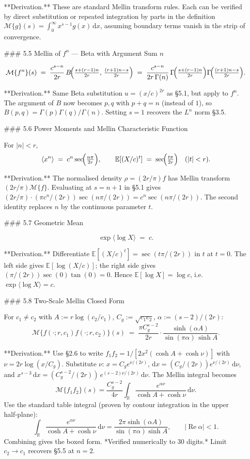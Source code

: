 **Derivation.** These are standard Mellin transform rules. Each can be verified by direct substitution or repeated integration by parts in the definition $\mathcal M\{g\}(s) = \int_{0}^{\infty}x^{s-1}g(x)\,\mathrm dx$, assuming boundary terms vanish in the strip of convergence.

### 5.5 Mellin of $f^{n}$ — Beta with Argument Sum $n$

$$
\mathcal M\{f^{n}\}(s) \;=\; \frac{c^{s-n}}{2r}\,B\!\Bigl(\tfrac{s+(r-1)n}{2r},\,\tfrac{(r+1)n-s}{2r}\Bigr) \;=\; \frac{c^{s-n}}{2r\,\Gamma(n)}\,\Gamma\!\Bigl(\tfrac{s+(r-1)n}{2r}\Bigr)\Gamma\!\Bigl(\tfrac{(r+1)n-s}{2r}\Bigr).
$$

**Derivation.** Same Beta substitution $u = (x/c)^{2r}$ as §5.1, but apply to $f^{n}$. The argument of $B$ now becomes $p,q$ with $p+q = n$ (instead of $1$), so $B(p,q) = \Gamma(p)\Gamma(q)/\Gamma(n)$. Setting $s=1$ recovers the $L^{n}$ norm §3.5.

### 5.6 Power Moments and Mellin Characteristic Function

For $|n|<r$,
$$
\langle x^{n}\rangle \;=\; c^{n}\sec\!\Bigl(\tfrac{n\pi}{2r}\Bigr),\qquad \mathbb E[(X/c)^{t}] \;=\; \sec\!\Bigl(\tfrac{t\pi}{2r}\Bigr)\quad(|t|<r).
$$

**Derivation.** The normalised density $\rho = (2r/\pi)f$ has Mellin transform $(2r/\pi)\mathcal M\{f\}$. Evaluating at $s = n+1$ in §5.1 gives $(2r/\pi)\cdot(\pi c^{n}/(2r))\sec(n\pi/(2r)) = c^{n}\sec(n\pi/(2r))$. The second identity replaces $n$ by the continuous parameter $t$.

### 5.7 Geometric Mean

$$
\exp\langle\log X\rangle \;=\; c.
$$

**Derivation.** Differentiate $\mathbb E[(X/c)^{t}] = \sec(t\pi/(2r))$ in $t$ at $t=0$. The left side gives $\mathbb E[\log(X/c)]$; the right side gives $(\pi/(2r))\sec(0)\tan(0) = 0$. Hence $\mathbb E[\log X] = \log c$, i.e. $\exp\langle\log X\rangle = c$.

### 5.8 Two‑Scale Mellin Closed Form

For $c_{1}\ne c_{2}$ with $A := r\log(c_{2}/c_{1})$, $C_{g} := \sqrt{c_{1}c_{2}}$, $\alpha := (s-2)/(2r)$:
$$
\boxed{\;\mathcal M\bigl\{f(\cdot;r,c_{1})f(\cdot;r,c_{2})\bigr\}(s) \;=\; \frac{\pi C_{g}^{s-2}}{2r}\cdot\frac{\sinh(\alpha A)}{\sin(\pi\alpha)\,\sinh A}.\;}
$$

**Derivation.** Use §2.6 to write $f_{1}f_{2} = 1/[2x^{2}(\cosh A + \cosh\nu)]$ with $\nu = 2r\log(x/C_{g})$. Substitute $\nu$: $x = C_{g}e^{\nu/(2r)}$, $\mathrm dx = (C_{g}/(2r))e^{\nu/(2r)}\,\mathrm d\nu$, and $x^{s-3}\,\mathrm dx = (C_{g}^{s-2}/(2r))\,e^{(s-2)\nu/(2r)}\,\mathrm d\nu$. The Mellin integral becomes
$$
\mathcal M\{f_{1}f_{2}\}(s) = \frac{C_{g}^{s-2}}{4r}\int_{\mathbb R}\frac{e^{\alpha\nu}}{\cosh A+\cosh\nu}\,\mathrm d\nu.
$$
Use the standard table integral (proven by contour integration in the upper half‑plane):
$$
\int_{\mathbb R}\frac{e^{\alpha\nu}}{\cosh A+\cosh\nu}\,\mathrm d\nu = \frac{2\pi\sinh(\alpha A)}{\sin(\pi\alpha)\sinh A},\qquad |\operatorname{Re}\alpha|<1.
$$
Combining gives the boxed form. *Verified numerically to 30 digits.* Limit $c_{2}\to c_{1}$ recovers §5.5 at $n=2$.

